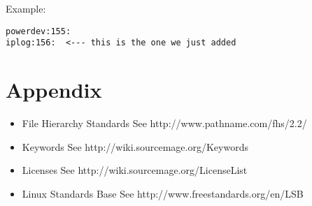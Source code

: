 \documentclass[a4paper,10pt]{book}
\begin{document}
Example:
\begin{verbatim}
powerdev:155:
iplog:156:  <--- this is the one we just added
\end{verbatim}

\chapter{Appendix}
\begin{itemize}
\item File Hierarchy Standards
	See http://www.pathname.com/fhs/2.2/
\item Keywords
	See http://wiki.sourcemage.org/Keywords
\item Licenses
	See http://wiki.sourcemage.org/LicenseList
\item Linux Standards Base
	See http://www.freestandards.org/en/LSB
\end{itemize}
\end{document}
